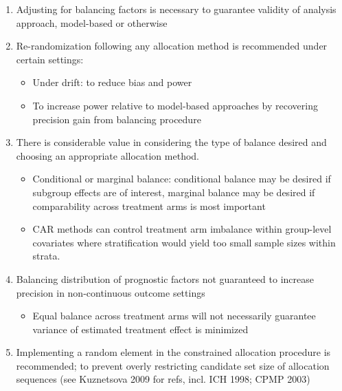 \begin{enumerate}
	\item Adjusting for balancing factors is necessary to guarantee validity of analysis approach, model-based or otherwise
	\item Re-randomization following any allocation method is recommended under certain settings: 
	\begin{itemize}
		\item Under drift: to reduce bias and power
		\item To increase power relative to model-based approaches by recovering precision gain from balancing procedure
	\end{itemize}
	\item There is considerable value in considering the type of balance desired and choosing an appropriate allocation method.
	\begin{itemize}
		\item Conditional or marginal balance: conditional balance may be desired if subgroup effects are of interest, marginal balance may be desired if comparability across treatment arms is most important
		\item CAR methods can control treatment arm imbalance within group-level covariates where stratification would yield too small sample sizes within strata.
	\end{itemize}
	\item Balancing distribution of prognostic factors not guaranteed to increase precision in non-continuous outcome settings
	\begin{itemize}
		\item Equal balance across treatment arms will not necessarily guarantee variance of estimated treatment effect is minimized
	\end{itemize}
	\item Implementing a random element in the constrained allocation procedure is recommended; to prevent overly restricting candidate set size of allocation sequences (see Kuznetsova 2009 for refs, incl. ICH 1998; CPMP 2003)
\end{enumerate}


